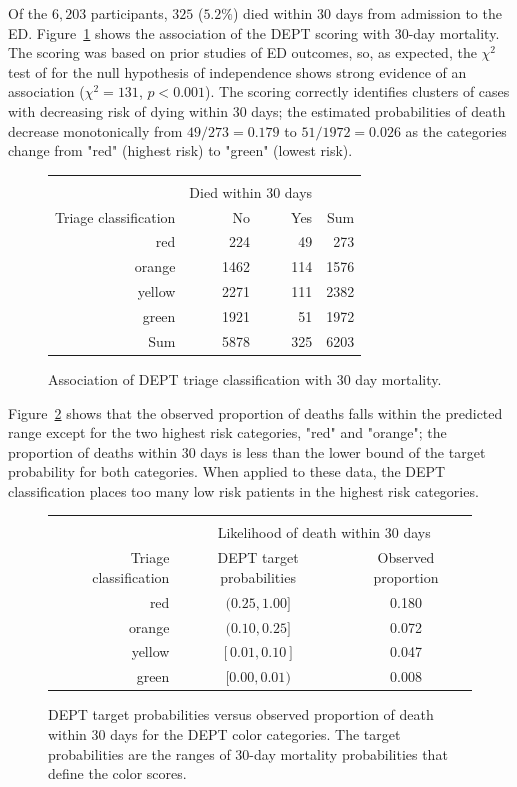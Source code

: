 Of the $6,203$ participants, $325$ ($5.2\%$) died within 30 days from admission to the ED.  Figure~\ref{figure:triageMort30Table} shows the association of the DEPT scoring with 30-day mortality.   The scoring was based on prior studies of ED outcomes, so, as expected, the $\chi^2$ test of for the null hypothesis of independence shows strong evidence of an association ($\chi^2 = 131$, $p < 0.001$).  The scoring correctly identifies clusters of cases with decreasing risk of dying within 30 days; the estimated probabilities of death decrease monotonically from $ 49/273 =  0.179$ to $ 51/1972 = 0.026$ as the categories change from "red" (highest risk) to "green" (lowest risk).

\begin{figure}[ht]
\centering
\begin{tabular}{rrrr}
  \hline \\
  & \multicolumn{2}{c}{Died within 30 days} & \\
Triage classification & No & Yes & Sum \\
  \hline
red & 224 & 49 & 273 \\
  orange & 1462 & 114 & 1576 \\
  yellow & 2271 & 111 & 2382 \\
  green & 1921 & 51 & 1972 \\
  Sum & 5878 & 325 & 6203 \\
   \hline
\end{tabular}
\caption{Association of DEPT triage classification with
       30 day mortality.}
\label{figure:triageMort30Table}
\end{figure}

Figure~\ref{figure:predVsObsTriageMort30Table} shows that the observed proportion of deaths falls within the predicted range except for the two highest risk categories, "red" and "orange"; the proportion of deaths within 30 days is less than the lower bound of the target probability for both categories.  When applied to these data, the DEPT classification places too many low risk patients in the highest risk categories.

\begin{figure}[ht]
\centering
\begin{tabular}{rcc}
  \hline \\
  & \multicolumn{2}{c}{Likelihood of death within 30 days} \\
Triage classification & DEPT target probabilities & Observed proportion  \\
  \hline
red & $(0.25, 1.00]$ & 0.180   \\
orange & $(0.10, 0.25]$ & 0.072   \\
yellow & $[0.01, 0.10]$ & 0.047   \\
green & $[0.00, 0.01)$ & 0.008   \\
   \hline
\end{tabular}
\caption{DEPT target probabilities  versus observed proportion of death within 30 days for the DEPT color categories. The target probabilities are the ranges of 30-day mortality probabilities that define the color scores.} 
\label{figure:predVsObsTriageMort30Table}
\end{figure}

